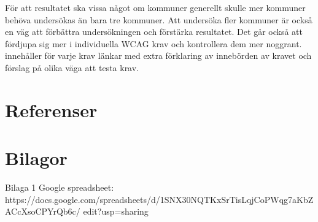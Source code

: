 \documentclass[11p]{article}
\begin{document}
    För att resultatet ska vissa något om kommuner generellt skulle mer kommuner behöva undersökas än bara tre kommuner.
    Att undersöka fler kommuner är också en väg att förbättra undersökningen och förstärka resultatet.
    Det går också att fördjupa sig mer i individuella WCAG krav och kontrollera dem mer noggrant.
    \textcite{WCAG_2.2} innehåller för varje krav länkar med extra förklaring av innebörden av kravet och förslag på olika väga att testa krav.

    \section{Referenser}

    \printbibliography

    \section{Bilagor}
    Bilaga 1
    Google spreadsheet:
    \\ https://docs.google.com/spreadsheets/d/1SNX30NQTKxSrTisLqjCoPWqg7aKbZACcXsoCPYrQb6c/
    edit?usp=sharing
\end{document}
